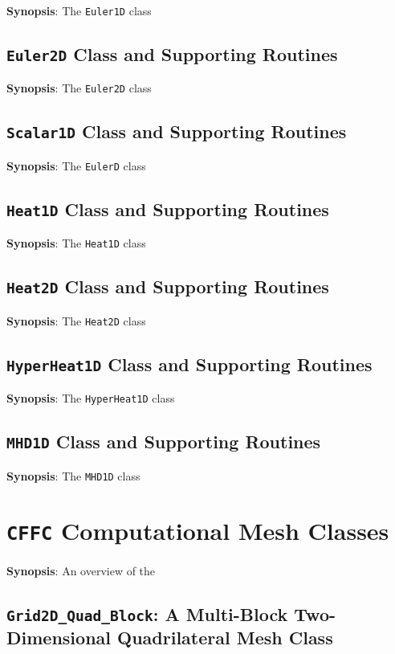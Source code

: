 \documentclass[11pt]{report}
\begin{document}
{\bf Synopsis}: The {\tt Euler1D} class

\section{{\tt Euler2D} Class and Supporting Routines}

{\bf Synopsis}: The {\tt Euler2D} class

\section{{\tt Scalar1D} Class and Supporting Routines}

{\bf Synopsis}: The {\tt EulerD} class

\section{{\tt Heat1D} Class and Supporting Routines}

{\bf Synopsis}: The {\tt Heat1D} class

\section{{\tt Heat2D} Class and Supporting Routines}

{\bf Synopsis}: The {\tt Heat2D} class

\section{{\tt HyperHeat1D} Class and Supporting Routines}

{\bf Synopsis}: The {\tt HyperHeat1D} class

\section{{\tt MHD1D} Class and Supporting Routines}

{\bf Synopsis}: The {\tt MHD1D} class

\chapter{{\tt CFFC} Computational Mesh Classes}

{\bf Synopsis}: An overview of the

\section{{\tt Grid2D\_Quad\_Block}: A Multi-Block 
         Two-Dimensional Quadrilateral Mesh Class}
\end{document}
